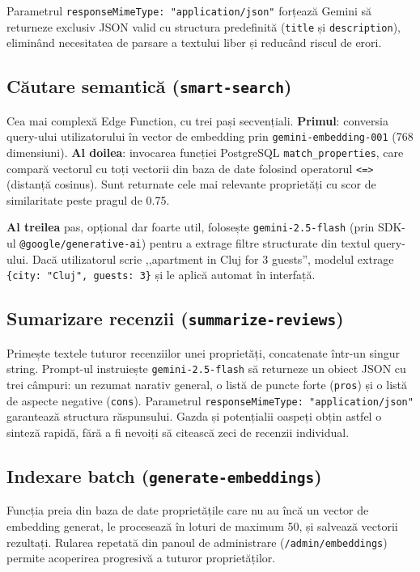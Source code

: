 \documentclass[12pt,a4paper,oneside]{report}
\begin{document}
Parametrul \texttt{responseMimeType: "application/json"} forțează Gemini să returneze exclusiv JSON valid cu structura predefinită (\texttt{title} și \texttt{description}), eliminând necesitatea de parsare a textului liber și reducând riscul de erori.

\subsection{Căutare semantică (\texttt{smart-search})}

Cea mai complexă Edge Function, cu trei pași secvențiali. \textbf{Primul}: conversia query-ului utilizatorului în vector de embedding prin \texttt{gemini-embedding-001} (768 dimensiuni). \textbf{Al doilea}: invocarea funcției PostgreSQL \texttt{match\_properties}, care compară vectorul cu toți vectorii din baza de date folosind operatorul \texttt{<=>} (distanță cosinus). Sunt returnate cele mai relevante proprietăți cu scor de similaritate peste pragul de 0.75.

\textbf{Al treilea} pas, opțional dar foarte util, folosește \texttt{gemini-2.5-flash} (prin SDK-ul \texttt{@google/generative-ai}) pentru a extrage filtre structurate din textul query-ului. Dacă utilizatorul scrie ,,apartment in Cluj for 3 guests'', modelul extrage \texttt{\{city: "Cluj", guests: 3\}} și le aplică automat în interfață.

\subsection{Sumarizare recenzii (\texttt{summarize-reviews})}

Primește textele tuturor recenziilor unei proprietăți, concatenate într-un singur string. Prompt-ul instruiește \texttt{gemini-2.5-flash} să returneze un obiect JSON cu trei câmpuri: un rezumat narativ general, o listă de puncte forte (\texttt{pros}) și o listă de aspecte negative (\texttt{cons}). Parametrul \texttt{responseMimeType: "application/json"} garantează structura răspunsului. Gazda și potențialii oaspeți obțin astfel o sinteză rapidă, fără a fi nevoiți să citească zeci de recenzii individual.

\subsection{Indexare batch (\texttt{generate-embeddings})}

Funcția preia din baza de date proprietățile care nu au încă un vector de embedding generat, le procesează în loturi de maximum 50, și salvează vectorii rezultați. Rularea repetată din panoul de administrare (\texttt{/admin/embeddings}) permite acoperirea progresivă a tuturor proprietăților.
\end{document}

